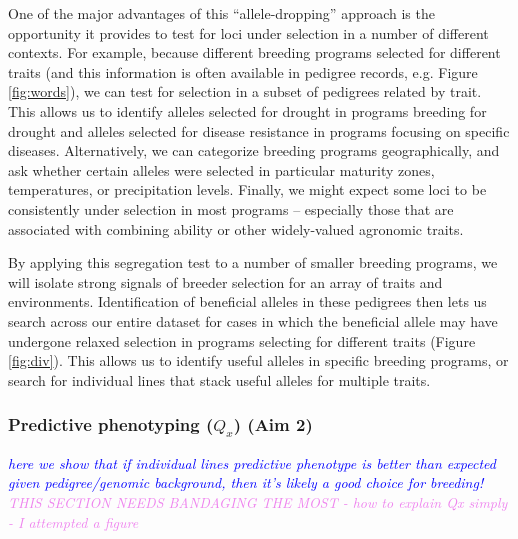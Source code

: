 \documentclass[12pt]{article}
\newcommand{\jri}[1]{\textcolor{blue}{ \emph{\scriptsize  #1}} }
\newcommand{\kc}[1]{\textcolor{violet}{ \emph{\scriptsize  #1}} }
\begin{document}
One of the major advantages of this 	``allele-dropping'' approach is the opportunity it provides to test for loci under selection in a number of different contexts.
For example, because  different breeding programs selected for different traits (and this information is often available in pedigree records, e.g. Figure \ref{fig:words}), we can test for selection in a subset of pedigrees related by trait.
This allows us to identify alleles selected for drought in programs breeding for drought and alleles selected for disease resistance in programs focusing on specific diseases.
Alternatively, we can categorize breeding programs geographically, and ask whether certain alleles were selected in particular maturity zones, temperatures, or precipitation levels.
Finally, we might expect some loci to be consistently under selection in most programs -- especially those that are associated with combining ability or other widely-valued agronomic traits. 

By applying this segregation test to a number of smaller breeding programs, we will  isolate strong signals of breeder selection for an array of traits and environments. 
Identification of beneficial alleles in these pedigrees then lets us search across our entire dataset for cases in which the beneficial allele may have undergone relaxed selection in programs selecting for different traits (Figure \ref{fig:div}).
This allows us to identify useful alleles in specific breeding programs, or search for individual lines that stack useful alleles for multiple traits. 


\subsubsection*{Predictive phenotyping ($Q_{x}$) (Aim 2)}
\jri{here we show that if individual lines predictive phenotype is better than expected given pedigree/genomic background, then it's likely a good choice for breeding! }
\kc{THIS SECTION NEEDS BANDAGING THE MOST - how to explain Qx simply - I attempted a figure}
\end{document}
